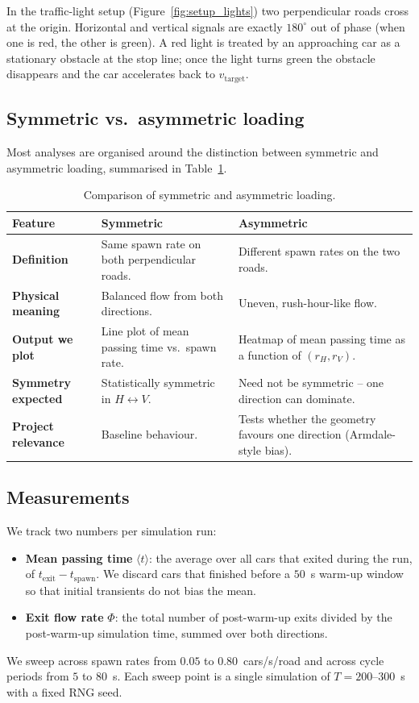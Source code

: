 \documentclass[11pt]{article}
\begin{document}
In the traffic-light setup (Figure~\ref{fig:setup_lights}) two perpendicular roads cross at the origin. Horizontal and vertical signals are exactly $180^{\circ}$ out of phase (when one is red, the other is green). A red light is treated by an approaching car as a stationary obstacle at the stop line; once the light turns green the obstacle disappears and the car accelerates back to $v_{\text{target}}$.

\subsection{Symmetric vs.\ asymmetric loading}
Most analyses are organised around the distinction between symmetric and asymmetric loading, summarised in Table~\ref{tab:symmetric_asymmetric}.

\begin{table}[H]
\centering
\small
\begin{tabular}{|p{2.4cm}|p{6.0cm}|p{6.0cm}|}
\hline
\textbf{Feature} & \textbf{Symmetric} & \textbf{Asymmetric} \\ \hline
\textbf{Definition} & Same spawn rate on both perpendicular roads. & Different spawn rates on the two roads. \\ \hline
\textbf{Physical meaning} & Balanced flow from both directions. & Uneven, rush-hour-like flow. \\ \hline
\textbf{Output we plot} & Line plot of mean passing time vs.\ spawn rate. & Heatmap of mean passing time as a function of $(r_H, r_V)$. \\ \hline
\textbf{Symmetry expected} & Statistically symmetric in $H \leftrightarrow V$. & Need not be symmetric -- one direction can dominate. \\ \hline
\textbf{Project relevance} & Baseline behaviour. & Tests whether the geometry favours one direction (Armdale-style bias). \\ \hline
\end{tabular}
\caption{Comparison of symmetric and asymmetric loading.}
\label{tab:symmetric_asymmetric}
\end{table}

\subsection{Measurements}
We track two numbers per simulation run:
\begin{itemize}
    \item \textbf{Mean passing time} $\langle t \rangle$: the average over all cars that exited during the run, of $t_{\text{exit}} - t_{\text{spawn}}$. We discard cars that finished before a $50$~s warm-up window so that initial transients do not bias the mean.
    \item \textbf{Exit flow rate} $\Phi$: the total number of post-warm-up exits divided by the post-warm-up simulation time, summed over both directions.
\end{itemize}
We sweep across spawn rates from $0.05$ to $0.80$~cars/s/road and across cycle periods from $5$ to $80$~s. Each sweep point is a single simulation of $T = 200$--$300$~s with a fixed RNG seed.
\end{document}
